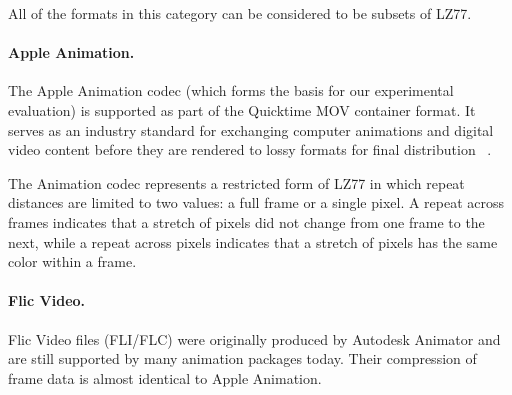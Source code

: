 All of the formats in this category can be considered to be subsets of
LZ77.

\paragraph{Apple Animation.}  
The Apple Animation codec (which forms the basis for our experimental
evaluation) is supported as part of the Quicktime MOV container
format.  It serves as an industry standard for exchanging computer
animations and digital video content before they are rendered to lossy
formats for final distribution~\cite[p.~106]{adobe-anim}\cite[p.~284]{harrington-anim} \cite[p.~367]{long-anim}\cite[p.~280]{pogue-anim}.

The Animation codec represents a restricted form of LZ77 in which
repeat distances are limited to two values: a full frame or a single
pixel.  A repeat across frames indicates that a stretch of pixels did
not change from one frame to the next, while a repeat across pixels
indicates that a stretch of pixels has the same color within a frame.

\paragraph{Flic Video.}
Flic Video files (FLI/FLC) were originally produced by Autodesk
Animator and are still supported by many animation packages today.
Their compression of frame data is almost identical to Apple
Animation.

